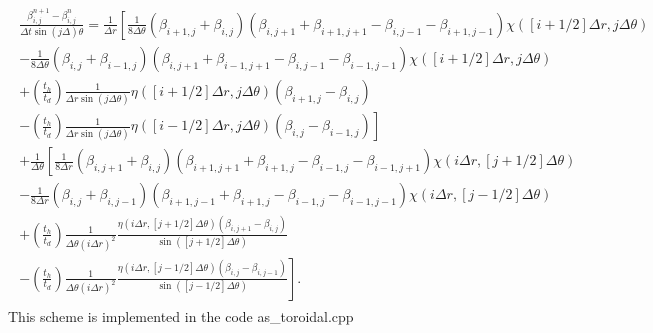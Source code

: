 \documentclass[letterpaper,10pt]{article}
\newcommand{\D}{\displaystyle}
\begin{document}
\begin{eqnarray}
\begin{aligned}
\frac{\beta_{i,j}^{n+1}-\beta_{i,j}^{n}}{\Delta t\sin (j\Delta)\theta}=\D\frac{1}{\Delta r}\left[\frac{1}{8\Delta\theta}(\beta_{i+1,j}+\beta_{i,j})(\beta_{i,j+1}+\beta_{i+1,j+1}-\beta_{i,j-1}-\beta_{i+1,j-1})\chi([i+1/2]\Delta r,j\Delta\theta)\right.\\
\left.-\frac{1}{8\Delta\theta}(\beta_{i,j}+\beta_{i-1,j})(\beta_{i,j+1}+\beta_{i-1,j+1}-\beta_{i,j-1}-\beta_{i-1,j-1})\chi([i+1/2]\Delta r,j\Delta\theta)\right.\\
+\left.\left(\frac{t_h}{t_d}\right)\frac{1}{\Delta r\sin(j\Delta\theta)}\eta([i+1/2]\Delta r,j\Delta\theta)(\beta_{i+1,j}-\beta_{i,j})\right.\\
\left.-\left(\frac{t_h}{t_d}\right)\frac{1}{\Delta r\sin(j\Delta\theta)}\eta([i-1/2]\Delta r,j\Delta\theta)(\beta_{i,j}-\beta_{i-1,j})\right]\\
+\frac{1}{\Delta \theta}\left[\frac{1}{8\Delta r}(\beta_{i,j+1}+\beta_{i,j})(\beta_{i+1,j+1}+\beta_{i+1,j}-\beta_{i-1,j}-\beta_{i-1,j+1})\chi(i\Delta r,[j+1/2]\Delta\theta)\right.\\
\left.-\frac{1}{8\Delta r}(\beta_{i,j}+\beta_{i,j-1})(\beta_{i+1,j-1}+\beta_{i+1,j}-\beta_{i-1,j}-\beta_{i-1,j-1})\chi(i\Delta r,[j-1/2]\Delta\theta)\right.\\
+\left.\left(\frac{t_h}{t_d}\right)\frac{1}{\Delta \theta(i\Delta r)^2}\frac{\eta(i\Delta r,[j+1/2]\Delta\theta)(\beta_{i,j+1}-\beta_{i,j})}{\sin([j+1/2]\Delta\theta)}\right.\\
\left.-\left(\frac{t_h}{t_d}\right)\frac{1}{\Delta \theta(i\Delta r)^2}\frac{\eta(i\Delta r,[j-1/2]\Delta\theta)(\beta_{i,j}-\beta_{i,j-1})}{\sin([j-1/2]\Delta\theta)}\right].
\end{aligned}
\end{eqnarray}
This scheme is implemented in the code as_toroidal.cpp
\end{document}
